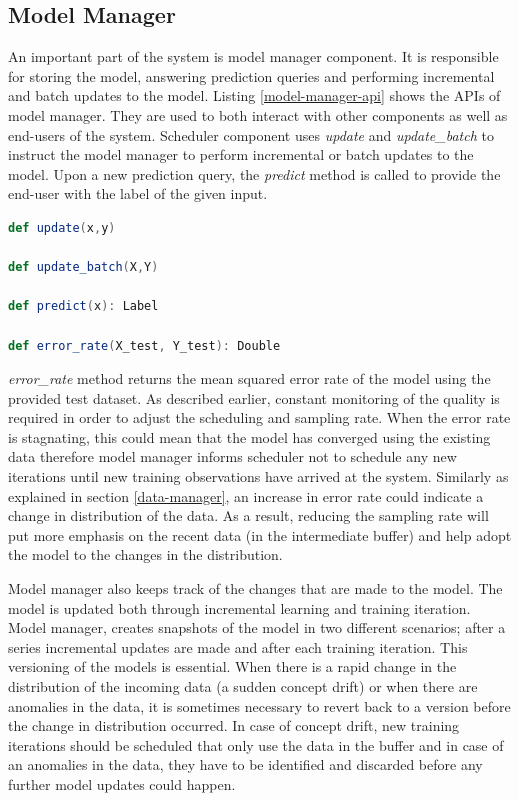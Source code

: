 \documentclass{sig-alternate-05-2015}
\begin{document}
\subsection{Model Manager} \label{model-manager} 
An important part of the system is model manager component.
It is responsible for storing the model, answering prediction queries and performing incremental and batch updates to the model.
Listing \ref{model-manager-api} shows the APIs of model manager.
They are used to both interact with other components as well as end-users of the system.
Scheduler component uses \textit{update} and \textit{update\_batch} to instruct the model manager to perform incremental or batch updates to the model.
Upon a new prediction query, the \textit{predict} method is called to provide the end-user with the label of the given input.
\begin{lstlisting}[language=Scala, basicstyle=\small\ttfamily, frame=tb ,columns=fullflexible,
showstringspaces=false,label=model-manager-api,caption=Model Manager API, numberstyle=\tiny]
def update(x,y)

def update_batch(X,Y)

def predict(x): Label

def error_rate(X_test, Y_test): Double

\end{lstlisting}
\textit{error\_rate} method returns the mean squared error rate of the model using the provided test dataset.
As described earlier, constant monitoring of the quality is required in order to adjust the scheduling and sampling rate.
When the error rate is stagnating, this could mean that the model has converged using the existing data therefore model manager informs scheduler not to schedule any new iterations until new training observations have arrived at the system.
Similarly as explained in section \ref{data-manager}, an increase in error rate could indicate a change in distribution of the data.
As a result, reducing the sampling rate will put more emphasis on the recent data (in the intermediate buffer) and help adopt the model to the changes in the distribution.

Model manager also keeps track of the changes that are made to the model.
The model is updated both through incremental learning and training iteration.
Model manager, creates snapshots of the model in two different scenarios; after a series incremental updates are made and after each training iteration.
This versioning of the models is essential.
When there is a rapid change in the distribution of the incoming data (a sudden concept drift) or when there are anomalies in the data, it is sometimes necessary to revert back to a version before the change in distribution occurred.
In case of concept drift, new training iterations should be scheduled that only use the data in the buffer and in case of an anomalies in the data, they have to be identified and discarded before any further model updates could happen.
\end{document}
